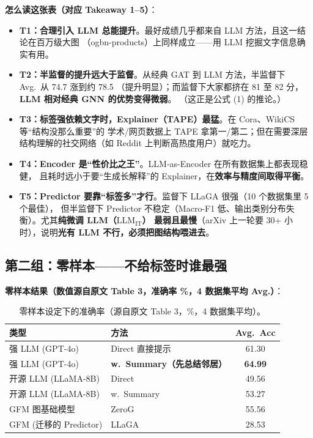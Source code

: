 \documentclass[11pt,UTF8,fontset=fandol]{ctexart}
\begin{document}
\textbf{怎么读这张表（对应 Takeaway 1{--}5）}：
\begin{itemize}[leftmargin=2em]
  \item \textbf{T1：合理引入 LLM 总能提升}。最好成绩几乎都来自 LLM 方法，且这一结论在百万级大图
        （ogbn-products）上同样成立——用 LLM 挖掘文字信息确实有用。
  \item \textbf{T2：半监督的提升远大于监督}。从经典 GAT 到 LLM 方法，半监督下 Avg.\ 从 74.7 涨到约 78.5
        （提升明显）；而监督下大家都挤在 81 至 82 分，\textbf{LLM 相对经典 GNN 的优势变得微弱}。
        （这正是公式 (1) 的推论。）
  \item \textbf{T3：标签强依赖文字时，Explainer（TAPE）最猛}。在 Cora、WikiCS 等“结构没那么重要”的
        学术/网页数据上 TAPE 拿第一/第二；但在需要深层结构理解的社交网络（如 Reddit 上判断高热度用户）就吃力。
  \item \textbf{T4：Encoder 是“性价比之王”}。LLM-as-Encoder 在所有数据集上都表现稳健，
        且耗时远小于要“生成长解释”的 Explainer，在\textbf{效率与精度间取得平衡}。
  \item \textbf{T5：Predictor 要靠“标签多”才行}。监督下 LLaGA 很强（10 个数据集里 5 个最佳），
        但半监督下 Predictor 不稳定（Macro-F1 低、输出类别分布失衡）。尤其\textbf{纯微调 LLM（$\mathrm{LLM_{IT}}$）
        最弱且最慢}（arXiv 上一轮要 30+ 小时），说明\textbf{光有 LLM 不行，必须把图结构喂进去}。
\end{itemize}

\subsection{第二组：零样本——不给标签时谁最强}

\textbf{零样本结果（数值源自原文 Table 3，准确率 \%，4 数据集平均 Avg.）}：

\begin{table}[H]\centering
\caption{零样本设定下的准确率（源自原文 Table 3，\%，4 数据集平均）。}
\begin{tabular}{llc}
\toprule
类型 & 方法 & Avg.\ Acc \\
\midrule
强 LLM (GPT-4o) & Direct 直接提示 & 61.30 \\
强 LLM (GPT-4o) & \textbf{w.\ Summary（先总结邻居）} & \textbf{64.99} \\
开源 LLM (LLaMA-8B) & Direct & 49.56 \\
开源 LLM (LLaMA-8B) & w.\ Summary & 53.27 \\
GFM 图基础模型 & ZeroG & 55.56 \\
GFM (迁移的 Predictor) & LLaGA & 28.53 \\
\bottomrule
\end{tabular}
\end{table}
\end{document}
